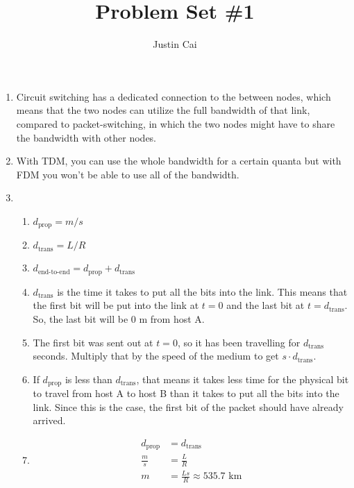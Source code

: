 \documentclass{article}
\title{Problem Set \#1}
\author{Justin Cai}
\begin{document}
    \maketitle
    \begin{enumerate}
        \item Circuit switching has a dedicated connection to the between nodes, 
        which means that the two nodes can utilize the full bandwidth of that link,
         compared to packet-switching, in which the two nodes might have to share the
          bandwidth with other nodes. 

        \item With TDM, you can use the whole bandwidth for a certain quanta but with FDM
        you won't be able to use all of the bandwidth.

        \item 
        \begin{enumerate}
            \item $d_{\text{prop}} = m/s$
            \item $d_{\text{trans}} = L/R$
            \item $d_{\text{end-to-end}} = d_{\text{prop}} + d_{\text{trans}}$
            \item $d_{\text{trans}}$ is the time it takes to put all the bits into
            the link. This means that the first bit will be put into the link at 
            $t=0$ and the last bit at $t=d_{\text{trans}}$. So, the last bit will
            be $0$ m from host A.
            \item The first bit was sent out at $t=0$, so it has been 
            travelling for $d_\text{trans}$ seconds. Multiply that by the 
            speed of the medium to get $s \cdot d_\text{trans}$.
            \item If $d_\text{prop}$ is less than $d_\text{trans}$, that means it takes
            less time for the physical bit to travel from host A to host B than it 
            takes to put all the bits into the link. Since this is the case, the first bit
            of the packet should have already arrived.
            \item 
            \begin{align*}
                d_\text{prop} &= d_\text{trans}\\
                \frac{m}{s} &= \frac{L}{R}\\
                m &= \frac{Ls}{R} \approx \boxed{535.7 \text{ km}}
            \end{align*}
        \end{enumerate}
        

\end{enumerate}
\end{document}
